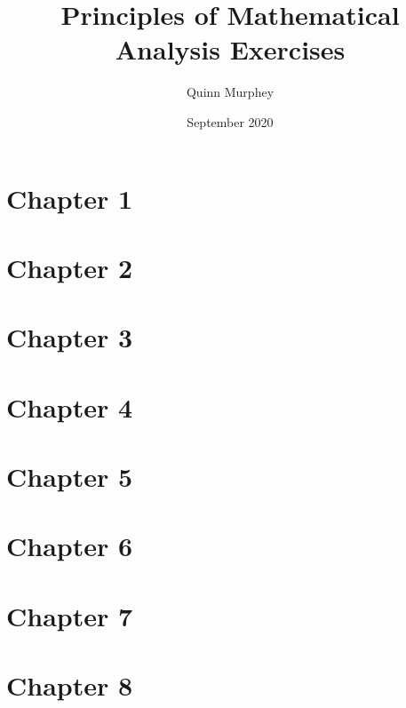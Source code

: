 \documentclass[12pt,letterpaper]{article}
\title{Principles of Mathematical Analysis Exercises}
\author{Quinn Murphey}
\date{September 2020}
\begin{document}
\maketitle

\section*{Chapter 1}


\section*{Chapter 2}


\section*{Chapter 3}


\section*{Chapter 4}


\section*{Chapter 5}


\section*{Chapter 6}


\section*{Chapter 7}


\section*{Chapter 8}

\end{document}
